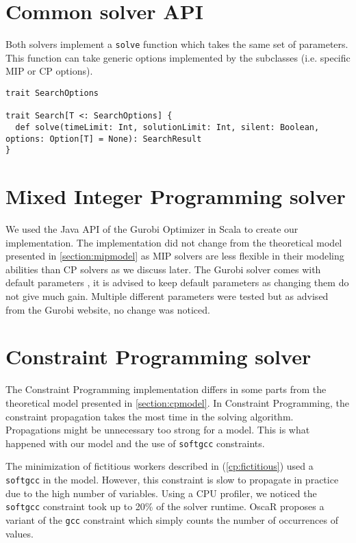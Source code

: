 \documentclass[../thesis.tex]{subfiles}
\begin{document}
\section{Common solver API}

Both solvers implement a \texttt{solve} function which takes the same set of parameters.
This function can take generic options implemented by the subclasses (i.e. specific MIP or CP options).

\begin{lstlisting}[style=scalaStyle,caption={Solver API},captionpos=b]
trait SearchOptions

trait Search[T <: SearchOptions] {
  def solve(timeLimit: Int, solutionLimit: Int, silent: Boolean, options: Option[T] = None): SearchResult
}
\end{lstlisting}

\section{Mixed Integer Programming solver}

We used the Java API \cite{gurobi:java} of the Gurobi Optimizer in Scala to create our implementation. 
The implementation did not change from the theoretical model presented in \autoref{section:mipmodel} as 
MIP solvers are less flexible in their modeling abilities than CP solvers as we discuss later. The Gurobi solver 
comes with default parameters \cite{gurobi:parameters}, it is advised to keep default parameters as 
changing them do not give much gain. Multiple different parameters were tested but as advised from the Gurobi website, 
no change was noticed.

\section{Constraint Programming solver}

The Constraint Programming implementation differs in some parts from the theoretical model 
presented in \autoref{section:cpmodel}. In Constraint Programming, the constraint propagation 
takes the most time in the solving algorithm. Propagations might be unnecessary too strong for a model.
This is what happened with our model and the use of \texttt{softgcc} constraints. 

The minimization of fictitious workers described in (\ref{cp:fictitious}) used a \texttt{softgcc} in the model.
However, this constraint is slow to propagate in practice due to the high number of variables.
Using a CPU profiler, we noticed the \texttt{softgcc} constraint took up to 20\% of the solver runtime. 
OscaR proposes a variant of the \texttt{gcc} constraint which simply counts the number of occurrences of values.
\end{document}
